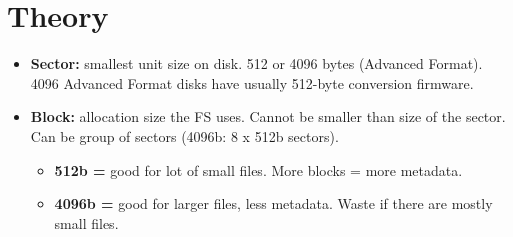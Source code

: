 \documentclass[10pt, a4paper, onecolumn, oneside, titlepage, openany]{book}
\begin{document}
\section{Theory}
\begin{itemize}
    \item \textbf{Sector:} smallest unit size on disk. 512 or 4096 bytes (Advanced Format). 4096 Advanced Format disks have usually 512-byte conversion firmware.
    \item \textbf{Block:} allocation size the FS uses. Cannot be smaller than size of the sector. Can be group of sectors (4096b: 8 x 512b sectors).
    \begin{itemize}
        \item \textbf{512b =} good for lot of small files. More blocks = more metadata.
        \item \textbf{4096b =}  good for larger files, less metadata. Waste if there are mostly small files.
    \end{itemize}
\end{itemize}
\end{document}

